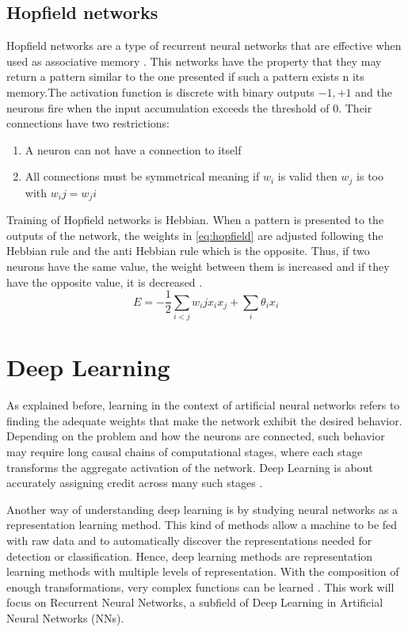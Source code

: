 \subsection{Hopfield networks}
Hopfield networks are a type of recurrent neural networks that are effective when used as associative memory \cite{hopfield1982neural}. This networks have the property that they may return a pattern similar to the one presented if such a pattern exists n its memory.The activation function is discrete with binary outputs ${-1,+1}$ and the neurons fire when the input accumulation exceeds the threshold of 0. Their connections have two restrictions:
\begin{enumerate}
\item A neuron can not have a connection to itself
\item All connections must be symmetrical meaning if $w_i$ is valid then $w_j$ is too with $w_ij=w_ji$
\end{enumerate}
Training of Hopfield networks is Hebbian. When a pattern is presented to the outputs of the network, the weights in \ref{eq:hopfield} are adjusted following the Hebbian rule and the anti Hebbian rule which is the opposite. Thus, if two neurons have the same value, the weight between them is increased and if they have the opposite value, it is decreased \cite{strom2007hebbian}.
\begin{equation}
\label{eq:hopfield}
E= -\frac{1}{2} \sum_{i<j} w_ij x_i x_j + \sum_i \theta_i x_i
\end{equation}

\section{Deep Learning}
As explained before, learning in the context of artificial neural networks refers to finding the adequate weights that make the network exhibit the desired behavior. Depending on the problem and how the neurons are connected, such behavior may require long causal chains of computational stages, where each stage transforms the aggregate activation of the network. Deep Learning is about accurately assigning credit across many such stages \cite{schmidhuber2015deep}.

Another way of understanding deep learning is by studying neural networks as a representation learning method. This kind of methods allow a machine to be fed with raw data and to automatically discover the representations needed for detection or classification. Hence, deep learning methods are representation learning methods with multiple levels of representation. With the composition of enough transformations, very complex functions can be learned \cite{lecun2015deep}. This work will focus on Recurrent Neural Networks, a subfield of Deep Learning in Artificial Neural Networks (NNs).


